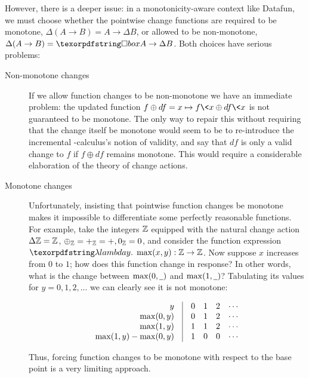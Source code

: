 However, there is a deeper issue: in a monotonicity-aware context like Datafun, we must choose whether the pointwise change functions are required to be monotone, $\Delta(A \to B) = A \to \Delta B$, or allowed to be non-monotone, $\Delta(A \to B) = \iso A \to \Delta B$.
%
Both choices have serious problems:

\begin{description}
\item[Non-monotone changes] If we allow function changes to be non-monotone we have an immediate problem: the updated function $f \oplus df = x \mapsto f\<x \oplus df\<x$ is not guaranteed to be monotone. The only way to repair this without requiring that the change itself be monotone would seem to be to re-introduce the incremental \fn-calculus's notion of validity, and say that $df$ is only a valid change to $f$ if $f \oplus df$ remains monotone. This would require a considerable elaboration of the theory of change actions.
  
\item[Monotone changes] Unfortunately, insisting that pointwise function changes be monotone makes it impossible to differentiate some perfectly reasonable functions. For example, take the integers $\mathbb{Z}$ equipped with the natural change action $\Delta\mathbb{Z} = \mathbb{Z}$, ${\oplus}_{\mathbb{Z}} = {+}_{\mathbb{Z}} = +, 0_{\mathbb{Z}} = 0$, and consider the function expression $\fnof{y} \max(x, y) : \Z \to \Z$. Now suppose $x$ increases from $0$ to $1$; how does this function change in response? In other words, what is the change between $\max(0, \pwild)$ and $\max(1, \pwild)$? Tabulating its values for $y = 0,1,2, ...$ we can clearly see it is not monotone:

  \[
    \begin{array}{r@{\quad}|@{\quad}llllll}
      y & 0 & 1 & 2 & \cdots\\%
      \max(0, y) & 0 & 1 & 2 & \cdots\\
      \max(1, y) & 1 & 1 & 2 & \cdots\\
      \max(1, y) - \max(0, y) & 1 & 0 & 0 & \cdots
    \end{array}
  \]

  \noindent
  Thus, forcing function changes to be monotone with respect to the base point is a very limiting approach.
\end{description}

